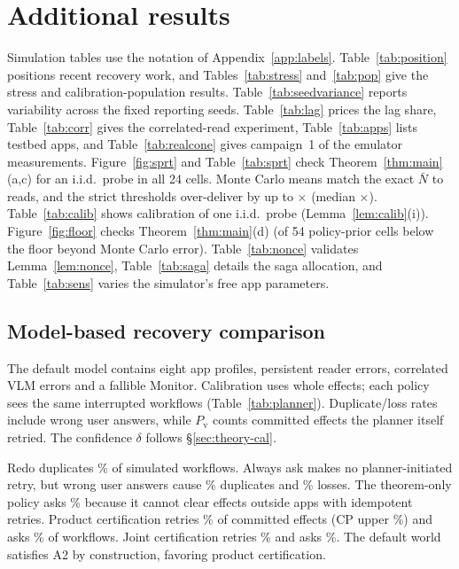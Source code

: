 \section{Additional results}
\label{app:extra}
Simulation tables use the notation of Appendix~\ref{app:labels}.
Table~\ref{tab:position} positions recent recovery work, and Tables~\ref{tab:stress} and~\ref{tab:pop} give the stress and calibration-population results.
Table~\ref{tab:seedvariance} reports variability across the \SimSeedCount{} fixed reporting seeds.
Table~\ref{tab:lag} prices the lag share, Table~\ref{tab:corr} gives the correlated-read experiment, Table~\ref{tab:apps} lists testbed apps, and Table~\ref{tab:realcone}
gives campaign~1 of the emulator measurements.
Figure~\ref{fig:sprt} and Table~\ref{tab:sprt} check Theorem~\ref{thm:main}(a,c) for an i.i.d.\ probe in all 24 cells. Monte Carlo means match the exact $\bar N$ to \SprtMCdev reads,
and the strict thresholds over-deliver by up to \SprtSlackMax$\times$ (median \SprtSlackMed$\times$). Table~\ref{tab:calib} shows calibration of one i.i.d.\ probe (Lemma~\ref{lem:calib}(i)).
Figure~\ref{fig:floor} checks Theorem~\ref{thm:main}(d) (\ImpViol of 54 policy-prior cells below the floor beyond Monte Carlo error). Table~\ref{tab:nonce} validates Lemma~\ref{lem:nonce},
Table~\ref{tab:saga} details the saga allocation, and Table~\ref{tab:sens} varies the simulator's free app parameters.

\subsection{Model-based recovery comparison}
\label{sec:setup}
The default model contains eight app profiles, persistent reader errors, correlated VLM errors and a fallible Monitor.
Calibration uses whole effects; each policy sees the same \SimN{} interrupted workflows (Table~\ref{tab:planner}).
Duplicate/loss rates include wrong user answers, while $P_{\mathrm v}$ counts committed effects the planner itself retried. The confidence $\delta$ follows \S\ref{sec:theory-cal}.



Redo duplicates \SimRedoDup\% of simulated workflows.
Always ask makes no planner-initiated retry, but wrong user answers cause \SimAskAllDup\% duplicates and \SimAskAllLoss\% losses.
The theorem-only policy asks \SimGtwoAsk\% because it cannot clear effects outside apps with idempotent retries.
Product certification retries \SimGhostPv\% of committed effects (CP upper \SimGhostPvHi\%) and asks \SimGhostAsk\% of workflows.
Joint certification retries \SimJointPv\% and asks \SimJointAsk\%.
The default world satisfies A2 by construction, favoring product certification.

